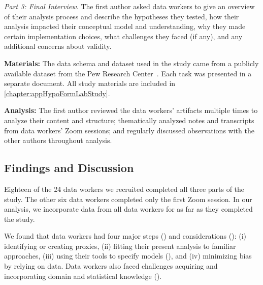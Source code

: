 \textit{Part 3: Final Interview.} The first author asked data workers to give an
overview of their analysis process and describe the hypotheses they tested, how
their analysis impacted their conceptual model and understanding, why they made
certain implementation choices, what challenges they faced (if any), and any
additional concerns about validity.

\noindent\textbf{Materials:} The data schema and dataset used in the study came from a
publicly available dataset from the Pew Research Center~\cite{pewDataset}. Each
task was presented in a separate document. All study materials are included in \autoref{chapter:appHypoFormLabStudy}.

\noindent\textbf{Analysis:} The first author reviewed the data workers' artifacts multiple
times to analyze their content and structure;
thematically analyzed notes and transcripts from data workers' Zoom sessions;
and regularly discussed observations with the other authors throughout analysis.

\subsection{Findings and Discussion} 


Eighteen of the 24 data workers we recruited completed all three parts of the study.
The other six data workers completed only the first Zoom session. In our analysis,
we incorporate data from all data workers for as far as they completed the study. 

We found that data workers had four major steps (\rqSteps) and considerations
(\rqProcess): (i) identifying or creating proxies, (ii) fitting their present
analysis to familiar approaches, (iii) using their tools to specify models
(\rqTools), and (iv) minimizing bias by relying on data. Data workers also faced
challenges acquiring and incorporating domain and statistical knowledge
(\rqProcess).

